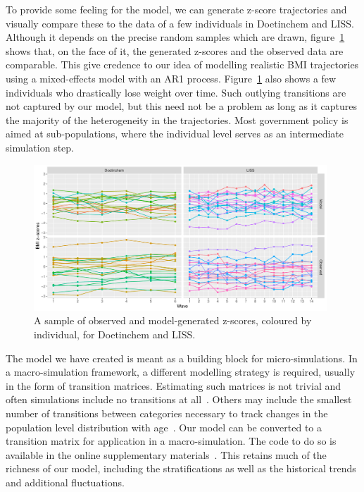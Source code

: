 \documentclass{imammb}
\numberwithin{equation}{section}
\begin{document}
To provide some feeling for the model, we can generate z-score trajectories and visually compare these to the data of a few individuals in Doetinchem and LISS. Although it depends on the precise random samples which are drawn, figure~\ref{fig:Individual Z-Score Trajectories} shows that, on the face of it, the generated z-scores and the observed data are comparable. This give credence to our idea of modelling realistic BMI trajectories using a mixed-effects model with an AR1 process. Figure~\ref{fig:Individual Z-Score Trajectories} also shows a few individuals who drastically lose weight over time. Such outlying transitions are not captured by our model, but this need not be a problem as long as it captures the majority of the heterogeneity in the trajectories. Most government policy is aimed at sub-populations, where the individual level serves as an intermediate simulation step.

\vspace{-4mm}

\begin{figure}[!h]
\centering\includegraphics[width=0.98\textwidth] {"Figures/Individual Z-Score Trajectories.pdf"}
\caption{A sample of observed and model-generated z-scores, coloured by individual, for Doetinchem and LISS.}
\label{fig:Individual Z-Score Trajectories}
\vspace*{-11pt}
\end{figure}

\vspace{2mm}

The model we have created is meant as a building block for micro-simulations. In a macro-simulation framework, a different modelling strategy is required, usually in the form of transition matrices. Estimating such matrices is not trivial and often simulations include no transitions at all~\citep{Hendriksen2015}. Others may include the smallest number of transitions between categories necessary to track changes in the population level distribution with age~\citep{VandeKassteele2012}. Our model can be converted to a transition matrix for application in a macro-simulation. The code to do so is available in the online supplementary materials~\citep{Bogaardt2023}. This retains much of the richness of our model, including the stratifications as well as the historical trends and additional fluctuations.
\end{document}
